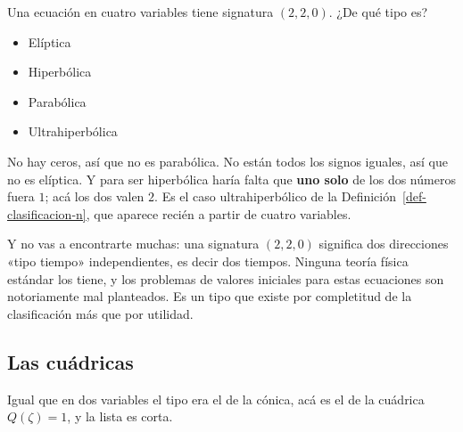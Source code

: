 \documentclass[
  spanish,
  a4paper,
]{scrbook}
\providecommand{\tightlist}{%
  \setlength{\itemsep}{0pt}\setlength{\parskip}{0pt}}
\theoremstyle{definition}
\theoremstyle{plain}
\theoremstyle{definition}
\theoremstyle{plain}
\theoremstyle{definition}
\theoremstyle{remark}
\begin{document}
Una ecuación en cuatro variables tiene signatura \((2,2,0)\). ¿De qué
tipo es?

\begin{itemize}
\tightlist
\item
  {Elíptica}
\item
  {Hiperbólica}
\item
  {Parabólica}
\item
  {Ultrahiperbólica}
\end{itemize}

No hay ceros, así que no es parabólica. No están todos los signos
iguales, así que no es elíptica. Y para ser hiperbólica haría falta que
\textbf{uno solo} de los dos números fuera \(1\); acá los dos valen
\(2\). Es el caso ultrahiperbólico de la
Definición~\ref{def-clasificacion-n}, que aparece recién a partir de
cuatro variables.

Y no vas a encontrarte muchas: una signatura \((2,2,0)\) significa dos
direcciones «tipo tiempo» independientes, es decir dos tiempos. Ninguna
teoría física estándar los tiene, y los problemas de valores iniciales
para estas ecuaciones son notoriamente mal planteados. Es un tipo que
existe por completitud de la clasificación más que por utilidad.

\subsection{Las cuádricas}\label{sec-cuadricas}

Igual que en dos variables el tipo era el de la cónica, acá es el de la
cuádrica \(Q(\zeta)=1\), y la lista es corta.
\end{document}
